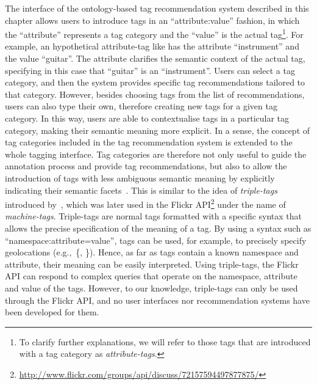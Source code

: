 The interface of the ontology-based tag recommendation system described in this chapter allows users to introduce tags in an ``attribute:value'' fashion, in which the ``attribute'' represents a tag category and the ``value'' is the actual tag\footnote{To clarify further explanations, we will refer to those tags that are introduced with a tag category as \emph{attribute-tags}.}. For example, an hypothetical attribute-tag like  has the attribute ``instrument'' and the value ``guitar''. The attribute clarifies the semantic context of the actual tag, specifying in this case that ``guitar'' is an ``instrument''.
Users can select a tag category, and then the system provides specific tag recommendations tailored to that category. However, besides choosing tags from the list of recommendations, users can also type their own, therefore creating new tags for a given tag category. 
In this way, users are able to contextualise tags in a particular tag category, making their semantic meaning more explicit.
In a sense, the concept of tag categories included in the tag recommendation system is extended to the whole tagging interface. 
Tag categories are therefore not only useful to guide the annotation process and provide tag recommendations, but also to allow the introduction of tags with less ambiguous semantic meaning by explicitly indicating their semantic facets~\citep{halpin2006}.
This is similar to the idea of \emph{triple-tags} introduced by~\cite{Catt2006}, which was later used in the Flickr API\footnote{\url{http://www.flickr.com/groups/api/discuss/72157594497877875/}} under the name of \emph{machine-tags}. Triple-tags are normal tags formatted with a specific syntax that allows the precise specification of the meaning of a tag. By using a syntax such as ``namespace:attribute=value'', tags can be used, for example, to precisely specify geolocations (e.g.,~\{, \}). Hence, as far as tags contain a known namespace and attribute, their meaning can be easily interpreted. Using triple-tags, the Flickr API can respond to complex queries that operate on the namespace, attribute and value of the tags.
However, to our knowledge, triple-tags can only be used through the Flickr API, and no user interfaces nor recommendation systems have been developed for them.

